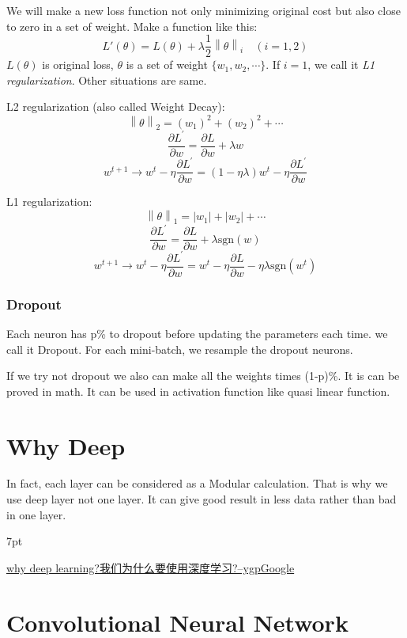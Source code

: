 \documentclass{article}
\newenvironment{quoteblock}{%
\def\FrameCommand{%
\hspace{1pt}%
{\color{DarkBlue}\vrule width 2pt}%
{\color{formalshade}\vrule width 4pt}%
\colorbox{formalshade}%
}%
\MakeFramed{\advance\hsize-\width\FrameRestore}%
\noindent\hspace{-4.55pt}%
\begin{adjustwidth}{}{7pt}%
\vspace{2pt}\vspace{2pt}%
}
{%
\vspace{2pt}\end{adjustwidth}\endMakeFramed%
}
\begin{document}
We will make a new loss function not only minimizing original cost but also close to zero in a set of weight. Make a function like this:
$$
L'(\theta) = L(\theta) + \lambda\frac{1}{2}\left \| \theta \right \|_{i} \quad(i = 1,2)
$$
$L(\theta)$ is original loss, $\theta$ is a set of weight $\{w_1,w_2,\cdots\}$. If $i=1$, we call it \textit{L1 regularization}. Other situations are same.

L2 regularization (also called Weight Decay):
$$
\left \| \theta \right \|_{2}=(w_1)^2+(w_2)^2+\cdots
$$
$$
\frac{\partial{L}^{\prime}}{\partial w}=\frac{\partial{L}}{\partial w}+\lambda w
$$
$$
w^{t+1}\to w^t - \eta \frac{\partial{L}^{\prime}}{\partial w} = (1-\eta\lambda)w^t-\eta\frac{\partial{L}^{\prime}}{\partial w}
$$

L1 regularization:
$$
\left \| \theta \right \|_{1}=|w_1|+|w_2|+\cdots
$$
$$
\frac{\partial{L}^{\prime}}{\partial w}=\frac{\partial{L}}{\partial w}+\lambda \text{sgn}(w)
$$
$$
w^{t+1}\to w^t - \eta \frac{\partial{L}^{\prime}}{\partial w} = w^t-\eta\frac{\partial{L}}{\partial w}-\eta\lambda\text{sgn}(w^t)
$$

\subsubsection{Dropout}

Each neuron has p\% to dropout before updating the parameters each time. we call it Dropout. For each mini-batch, we resample the dropout neurons.

If we try not dropout we also can make all the weights times (1-p)\%. It is can be proved in math. It can be used in activation function like quasi linear function.

\section{Why Deep}

In fact, each layer can be considered as a Modular calculation. That is why we use deep layer not one layer. It can give good result in less data rather than bad in one layer.

\begin{quoteblock}
    \href{https://blog.csdn.net/ygp12345/article/details/108902064}{why deep learning?我们为什么要使用深度学习?--ygpGoogle}
\end{quoteblock}

\section{Convolutional Neural Network}
\end{document}
